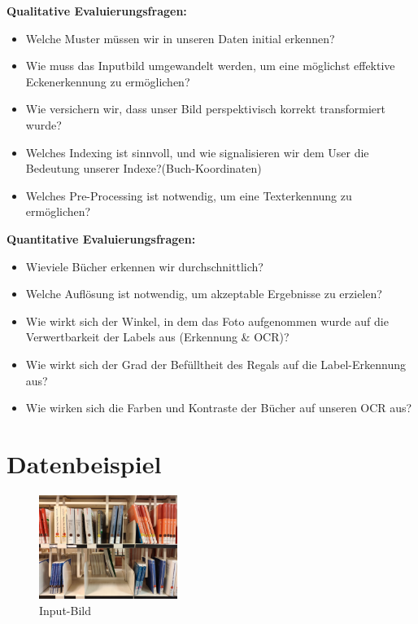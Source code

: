 \documentclass[deutsch]{scrartcl}
\begin{document}
\textbf{Qualitative Evaluierungsfragen:}
\begin{itemize}
	\item Welche Muster müssen wir in unseren Daten initial erkennen?
	\item Wie muss das Inputbild umgewandelt werden, um eine möglichst effektive Eckenerkennung zu ermöglichen?
	\item Wie versichern wir, dass unser Bild perspektivisch korrekt transformiert wurde?
	\item Welches Indexing ist sinnvoll, und wie signalisieren wir dem User die Bedeutung unserer Indexe?(Buch-Koordinaten)
	\item Welches Pre-Processing ist notwendig, um eine Texterkennung zu ermöglichen?
\end{itemize}

\textbf{Quantitative Evaluierungsfragen:}
\begin{itemize}
	\item Wieviele Bücher erkennen wir durchschnittlich?
	\item Welche Auflösung ist notwendig, um akzeptable Ergebnisse zu erzielen?
	\item Wie wirkt sich der Winkel, in dem das Foto aufgenommen wurde auf die Verwertbarkeit der Labels aus (Erkennung \& OCR)?
	\item Wie wirkt sich der Grad der Befülltheit des Regals auf die Label-Erkennung aus?
	\item Wie wirken sich die Farben und Kontraste der Bücher auf unseren OCR aus?
\end{itemize}

\section{Datenbeispiel}
\begin{figure}[H]
 \centering
 \includegraphics[width=0.4\textwidth]{input.jpg}
 \caption{Input-Bild}
 \label{fig:img}
\end{figure}
\end{document}
